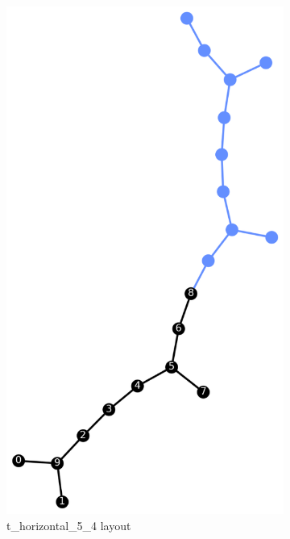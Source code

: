 \begin{figure}[!htb]
\begin{subfigure}{0.25\linewidth}
        \includegraphics[width=\linewidth]{image/dj_10_t_horizontal_5_4.png}
        \caption{t\_horizontal\_5\_4 layout}
        \label{fig:dj_10_t_horizontal_5_4}
    \end{subfigure}
    \hfill
    \begin{subfigure}{0.25\linewidth}

\end{subfigure}
\end{figure}
